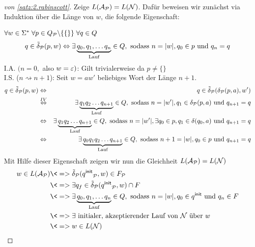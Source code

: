 \begin{proof}[von \autoref{satz:2.rabinscott}]
        Zeige $L(\mathcal{A}_{\mathcal{P}})=L(\mathcal{N})$. 
        Dafür beweisen wir zunächst via Induktion über die Länge von $w$, die folgende Eigenschaft:
        
        $\forall w\in\Sigma^*\; \forall p\in Q_{\mathcal{P}}\backslash\{\{\}\}\; \forall q\in Q$
        $$q\in\tilde\delta_{\mathcal{P}}(p,w) \Leftrightarrow \exists \underbrace{q_0, q_1,\ldots q_n}_{\text{Lauf}}\in Q, \text{ sodass }  n=|w|, q_0\in p \text{ und } q_n=q$$
        I.A. $(n=0,$ also $w=\varepsilon)$: Gilt trivialerweise da $p\neq\{\}$\\
        I.S. ($n\rightsquigarrow n+1$): Seit $w=aw'$ beliebiges Wort der Länge $n+1$.
        \begin{eqnarray*}
                q\in\tilde\delta_{\mathcal{P}}(p,w) 
                & \Leftrightarrow & q\in\tilde\delta_{\mathcal{P}}(\delta_{\mathcal{P}}(p,a),w')\\
                & \stackrel{IV}{\Leftrightarrow} & \exists\underbrace{q_1q_2\ldots q_{n+1}}_{\text{Lauf}}\in Q, \text{ sodass }  n=|w'|, q_1\in \delta_{\mathcal{P}}(p,a) \text{ und } q_{n+1}=q\\
                & \Leftrightarrow & \exists\underbrace{q_1q_2\ldots q_{n+1}}_{\text{Lauf}}\in Q, \text{ sodass }  n=|w'|, \exists q_0\in p, q_1\in\delta(q_0,a) \text{ und } q_{n+1}=q\\
                & \Leftrightarrow & \exists\underbrace{q_0q_1q_2\ldots q_{n+1}}_{\text{Lauf}}\in Q,\text{ sodass }  n+1=|w|, q_0\in p \text{ und } q_{n+1}=q
        \end{eqnarray*}
        Mit Hilfe dieser Eigenschaft zeigen wir nun die Gleichheit $L(\mathcal{A}_{\mathcal{P}})=L(\mathcal{N})$
        \begin{align*}
         w\in L(\A_\calP) 
         &\<=> \tilde\delta_\calP(\qinit_\calP,w)\in F_\calP\\
         &\<=> \exists q_f\in \tilde\delta_\calP(\qinit_\calP,w)\cap F\\
         &\<=> \exists \underbrace{q_0, q_1,\ldots q_n}_{\text{Lauf}}\in Q, \text{ sodass }  n=|w|, q_0\in \qinit \text{ und } q_n\in F\\
         &\<=> \exists \text{ initialer, akzeptierender Lauf von $\calN$ über $w$} \\
         &\<=> w\in L(\calN)
        \end{align*}
\end{proof}

